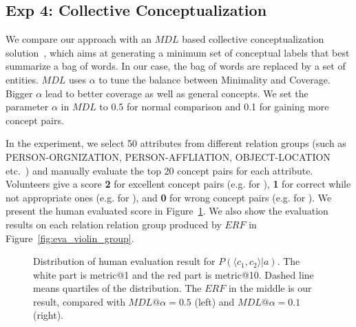 %
%


\subsection{Exp 4: Collective Conceptualization}
We compare our approach with an $MDL$ based collective conceptualization solution~\cite{sunconceptual}, which aims at generating a minimum set of conceptual labels that best summarize a bag of words.
In our case, the bag of words are replaced by a set of entities.
$MDL$ uses $\alpha$ to tune the balance between \ac{Minimality} and \ac{Coverage}. 
Bigger $\alpha$ lead to better coverage as well as general concepts.
We set the parameter $\alpha$ in $MDL$ to 0.5 for normal comparison and 0.1 for gaining more concept pairs.

In the experiment, we select 50 attributes from different relation groups (such as \ac{PERSON-ORGNIZATION, PERSON-AFFLIATION, OBJECT-LOCATION} etc.\ ) and manually evaluate the top 20 concept pairs for each attribute.
Volunteers give a score \textbf{2} for excellent concept pairs (e.g.  for ), \textbf{1} for correct while not appropriate ones (e.g.  for  ), and \textbf{0} for wrong concept pairs (e.g.  for ).
We present the human evaluated score in Figure~\ref{fig:eva_violin_pc1c2ga}.
We also show the evaluation results on each relation relation group produced by $ERF$ in Figure~\ref{fig:eva_violin_group}.

\begin{figure}[!htb]
\centering
\footnotesize
{}
\vspace{-7mm}
\caption{\small Distribution of human evaluation result for $P(\langle c_1,c_2 \rangle|a)$. \footnotesize The white part is metric@1 and the red part is metric@10. Dashed line means quartiles of the distribution. The $ERF$ in the middle is our result, compared with $MDL@\alpha=0.5$ (left) and $MDL@\alpha=0.1$(right). }
\label{fig:eva_violin_pc1c2ga}
\vspace{-4mm}
\end{figure}


